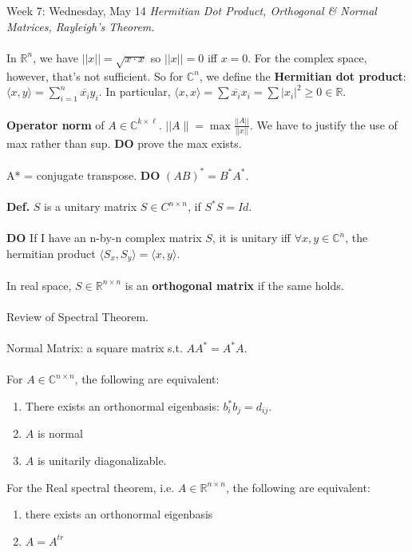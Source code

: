 \documentclass[12pt]{article}
\theoremstyle{remark}
\newcommand{\R}{\mathbb{R}}
\newcommand{\C}{\mathbb{C}}
\begin{document}
\newpage
\label{20}\begin{section}
{Week 7: Wednesday, May 14}
\indent\textit{Hermitian Dot Product, Orthogonal \& Normal Matrices, Rayleigh's Theorem.}\\\\
In $\R^n$, we have $||x|| = \sqrt{x \cdot x}$ so $||x|| = 0$ iff $x = 0$. For the complex space, however, that's not sufficient. So for $\C^n$, we define the \textbf{Hermitian dot product}: $\langle x,y\rangle = \sum_{i = 1}^{n} \overline{x_i}y_i$. In particular, $\langle x,x \rangle = \sum \overline{x_i}x_i = \sum |x_i|^2 \geq 0 \in \R$. 
\\\\
\textbf{Operator norm} of $A \in \C^{k \times \ell}$. $||A\| = \max \frac{||A||}{||x||}$. We have to justify the use of max rather than sup. \textbf{DO} prove the max exists. 
\\\\
A* = conjugate transpose. \textbf{DO}
$(AB)^* = B^*A^*$.
\\\\
\textbf{Def.} $S$ is a unitary matrix $S \in C^{n \times n}$, if $S^*S = Id$.
\\\\
\textbf{DO} If I have an n-by-n complex matrix $S$, it is unitary iff $\forall x,y \in \C^n$, the hermitian product  $\langle S_x,S_y \rangle = \langle x,y\rangle$.
\\\\
In real space, $S \in \R^{n \times n}$ is an \textbf{orthogonal matrix} if the same holds.
\\\\
Review of Spectral Theorem.
\\\\
Normal Matrix: a square matrix s.t. $AA^* = A^* A$.
\\\\
For $A \in \C^{n \times n}$, the following are equivalent:
\begin{enumerate}
\item There exists an orthonormal eigenbasis: $b_i^* b_j = d_{ij}$.
\item $A$ is normal
\item $A$ is unitarily diagonalizable.
\end{enumerate}
For the Real spectral theorem, i.e. $A \in \R^{n \times n}$, the following are equivalent:
\begin{enumerate}
\item there exists an orthonormal eigenbasis
\item $A = A^{tr}$
\end{enumerate}


\end{section}
\end{document}
